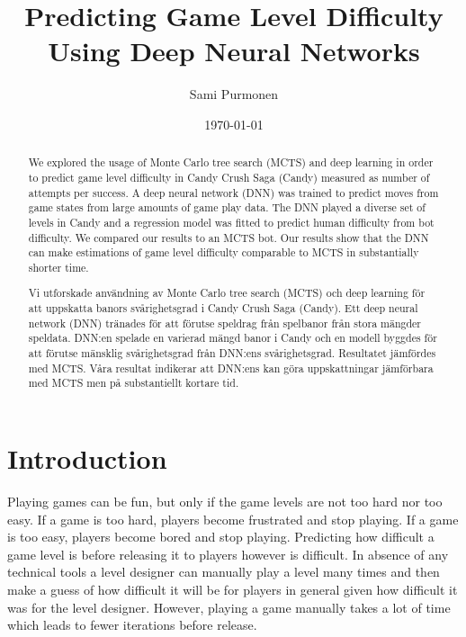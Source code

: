 \documentclass{kththesis}
\title{Predicting Game Level Difficulty Using Deep Neural Networks}
\author{Sami Purmonen}
\date{\today}
\begin{document}


\flyleaf

\begin{abstract}
We explored the usage of Monte Carlo tree search (MCTS) and deep learning in order to predict game level difficulty in Candy Crush Saga (Candy) measured as number of attempts per success. A deep neural network (DNN) was trained to predict moves from game states from large amounts of game play data. The DNN played a diverse set of levels in Candy and a regression model was fitted to predict human difficulty from bot difficulty. We compared our results to an MCTS bot. Our results show that the DNN can make estimations of game level difficulty comparable to MCTS in substantially shorter time.
\end{abstract}

\clearpage

\begin{otherlanguage}{swedish}
  \begin{abstract}
  Vi utforskade användning av Monte Carlo tree search (MCTS) och deep learning för att uppskatta banors svårighetsgrad i Candy Crush Saga (Candy). Ett deep neural network (DNN) tränades för att förutse speldrag från spelbanor från stora mängder speldata. DNN:en spelade en varierad mängd banor i Candy och en modell byggdes för att förutse mänsklig svårighetsgrad från DNN:ens svårighetsgrad. Resultatet jämfördes med MCTS. Våra resultat indikerar att DNN:ens kan göra uppskattningar jämförbara med MCTS men på substantiellt kortare tid.
  \end{abstract}
\end{otherlanguage}

\cleardoublepage

\tableofcontents


\mainmatter

\chapter{Introduction}
Playing games can be fun, but only if the game levels are not too hard nor too easy. If a game is too hard, players become frustrated and stop playing. If a game is too easy, players become bored and stop playing. Predicting how difficult a game level is before releasing it to players however is difficult. In absence of any technical tools a level designer can manually play a level many times and then make a guess of how difficult it will be for players in general given how difficult it was for the level designer. However, playing a game manually takes a lot of time which leads to fewer iterations before release.
\end{document}
